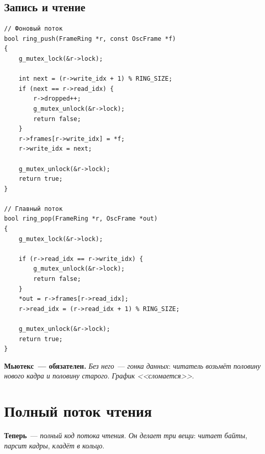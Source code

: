 \subsection{Запись и чтение}

\begin{listing}[htbp]
\begin{verbatim}
// Фоновый поток
bool ring_push(FrameRing *r, const OscFrame *f)
{
    g_mutex_lock(&r->lock);

    int next = (r->write_idx + 1) % RING_SIZE;
    if (next == r->read_idx) {
        r->dropped++;
        g_mutex_unlock(&r->lock);
        return false;
    }
    r->frames[r->write_idx] = *f;
    r->write_idx = next;

    g_mutex_unlock(&r->lock);
    return true;
}

// Главный поток
bool ring_pop(FrameRing *r, OscFrame *out)
{
    g_mutex_lock(&r->lock);

    if (r->read_idx == r->write_idx) {
        g_mutex_unlock(&r->lock);
        return false;
    }
    *out = r->frames[r->read_idx];
    r->read_idx = (r->read_idx + 1) % RING_SIZE;

    g_mutex_unlock(&r->lock);
    return true;
}
\end{verbatim}
\caption{\texttt{ring\_push()} и \texttt{ring\_pop()}}
\label{lst:pc-ring-push-pop}
\end{listing}

\begin{keybox}
\textbf{Мьютекс~--- обязателен.} \emph{Без} \emph{него}~---
\emph{гонка} \emph{данных}: \emph{читатель} \emph{возьмёт}
\emph{половину} \emph{нового} \emph{кадра} \emph{и}
\emph{половину} \emph{старого}. \emph{График} \emph{<<сломается>>}.
\end{keybox}

\section{Полный поток чтения}
\label{sec:pc-reader-full}

\textbf{Теперь}~--- \emph{полный} \emph{код} \emph{потока}
\emph{чтения}. \emph{Он} \emph{делает} \emph{три} \emph{вещи}:
\emph{читает} \emph{байты}, \emph{парсит} \emph{кадры},
\emph{кладёт} \emph{в} \emph{кольцо}.

